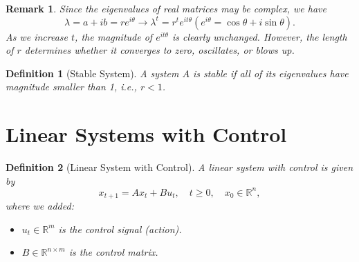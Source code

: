 \documentclass[a4 paper]{article}
\numberwithin{equation}{section}
\theoremstyle{boldStyle}
\newtheorem{remark}{Remark}[section]
\theoremstyle{boldBlueStyle}
\theoremstyle{boldPurpleStyle}
\theoremstyle{boldRedStyle}
\newtheorem{definition}{Definition}[section]
\theoremstyle{boldGreenStyle}
\begin{document}
\begin{remark}
  Since the eigenvalues of real matrices may be complex, we have
  \[
  \lambda = a + ib = re^{i\theta} \rightarrow \lambda^t = r^t e^{it\theta} (e^{i\theta} = \cos \theta + i \sin \theta).
  \]
  As we increase \( t \), the magnitude of \( e^{it\theta} \) is clearly unchanged. However, the length of \( r \) determines whether it converges to zero, oscillates, or blows up.
\end{remark}

\begin{definition}[Stable System]
  A system \( A \) is \textit{stable} if all of its eigenvalues have magnitude smaller than 1, i.e., \( r < 1 \).
\end{definition}






\newpage
\section{Linear Systems with Control}

\begin{definition}[Linear System with Control]
  A linear system with control is given by
  \begin{equation}
      x_{t+1} = A x_t + B u_t, \quad t \geq 0, \quad x_0 \in \mathbb{R}^n,
  \end{equation}
  where we added:
  \begin{itemize}
      \item \( u_t \in \mathbb{R}^m \) is the control signal (action).
      \item \( B \in \mathbb{R}^{n \times m} \) is the control matrix.
  \end{itemize}
\end{definition}
\end{document}

